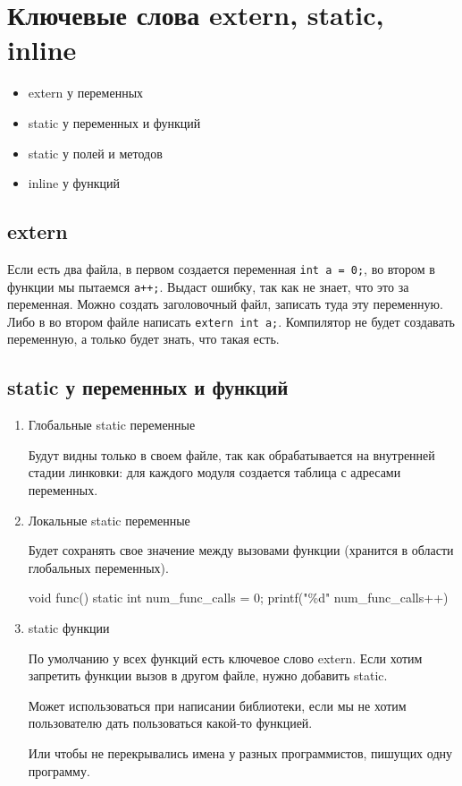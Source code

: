 \section{Ключевые слова extern, static, inline}
\begin{itemize}[noitemsep]
    \item extern у переменных
    \item static у переменных и функций
    \item static у полей и методов
    \item inline у функций
\end{itemize}
\subsection{extern}
Если есть два файла, в первом создается переменная {\tt int a = 0;}, во втором в функции мы пытаемся {\tt a++;}. Выдаст ошибку, так как не знает, что это за переменная. Можно создать заголовочный файл, записать туда эту переменную. Либо в во втором файле написать {\tt extern int a;}. Компилятор не будет создавать переменную, а только будет знать, что такая есть.
\subsection{static у переменных и функций}
\begin{enumerate}[noitemsep]
    \item Глобальные static переменные

	Будут видны только в своем файле, так как обрабатывается на внутренней стадии линковки: для каждого модуля создается таблица с адресами переменных.
    \item Локальные static переменные

	Будет сохранять свое значение между вызовами функции (хранится в области глобальных переменных).
\begin{ccode}
void func() {
    static int num_func_calls = 0;
    printf("\%d" num_func_calls++)
}
\end{ccode}
\item static функции

    По умолчанию у всех функций есть ключевое слово extern. Если хотим запретить функции вызов в другом файле, нужно добавить static.

    Может использоваться при написании библиотеки, если мы не хотим пользователю дать пользоваться какой-то функцией. 

    Или чтобы не перекрывались имена у разных программистов, пишущих одну программу.
\end{enumerate}
